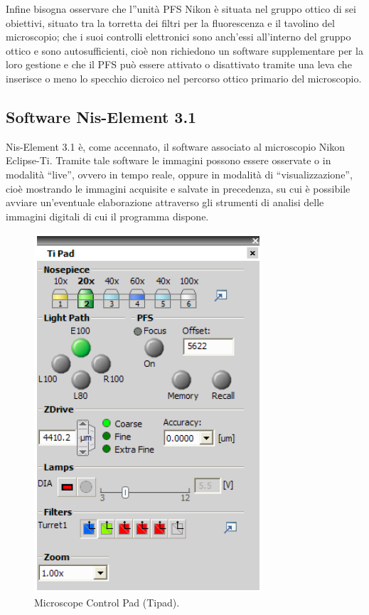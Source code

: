 Infine bisogna osservare che l''unità PFS Nikon è situata nel gruppo ottico di sei obiettivi, situato tra la torretta dei filtri per la fluorescenza e il tavolino del microscopio; che i suoi controlli elettronici sono anch'essi all'interno del gruppo ottico e sono autosufficienti, cioè non richiedono un software supplementare per la loro gestione e che il PFS può essere attivato o disattivato tramite una leva che inserisce o meno lo specchio dicroico nel percorso ottico primario del microscopio.


\subsection{Software Nis-Element 3.1}\label{NisElements}

Nis-Element 3.1 è, come accennato, il software associato al microscopio Nikon Eclipse-Ti.
Tramite tale software le immagini possono essere osservate o in modalità ``live'', ovvero in tempo reale, oppure in modalità di ``visualizzazione'', cioè mostrando le immagini acquisite e salvate in precedenza, su cui è possibile avviare un'eventuale elaborazione attraverso gli strumenti di analisi delle immagini digitali di cui il programma dispone.

\begin{figure}
 \centering
 \includegraphics[scale=.50]{img/CAP2pannello.png}
 \caption{\small{Microscope Control Pad (Tipad).}}
 \label{fig:pannello}
\end{figure}

